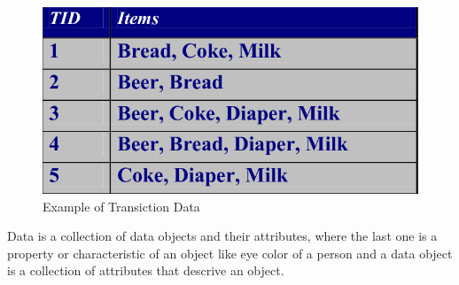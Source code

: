 \begin{figure}
    \caption{Example of Transiction Data}
    \label{img:transiction}
    \includegraphics[width=\textwidth]{Images/transiction}
\end{figure}
Data is a collection of data objects and their attributes, where the last one is a property or 
characteristic of an object like eye color of a person and a data object is a collection of 
attributes that descrive an object.

